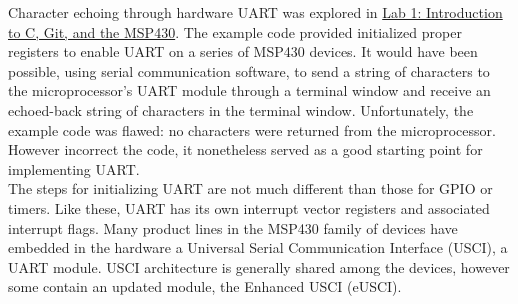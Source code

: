 \documentclass{hitec}
\begin{document}




Character echoing through hardware UART was explored in \href{https://github.com/RU09342/lab-1-intro-to-git-c-and-msp430-boorsteid4}{Lab 1: Introduction to C, Git, and the MSP430}. The example code provided initialized proper registers to enable UART on a series of MSP430 devices. It would have been possible, using serial communication software, to send a string of characters to the microprocessor's UART module through a terminal window and receive an echoed-back string of characters in the terminal window. Unfortunately, the example code was flawed: no characters were returned from the microprocessor. However incorrect the code, it nonetheless served as a good starting point for implementing UART.\\

\noindent The steps for initializing UART are not much different than those for GPIO or timers. Like these, UART has its own interrupt vector registers and associated interrupt flags. Many product lines in the MSP430 family of devices have embedded in the hardware a Universal Serial Communication Interface (USCI), a UART module. USCI architecture is generally shared among the devices, however some contain an updated module, the Enhanced USCI (eUSCI).
\end{document}
